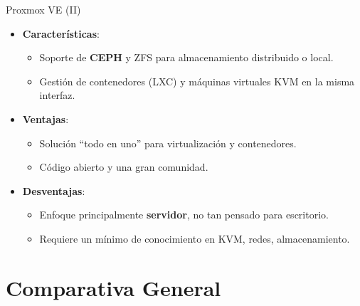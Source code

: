 \documentclass{beamer}
\begin{document}
\begin{frame}{Proxmox VE (II)}
    \begin{itemize}
        \item \textbf{Características}:
            \begin{itemize}
                \item Soporte de \textbf{CEPH} y ZFS para almacenamiento distribuido o local.
                \item Gestión de contenedores (LXC) y máquinas virtuales KVM en la misma interfaz.
            \end{itemize}
        \item \textbf{Ventajas}:
            \begin{itemize}
                \item Solución “todo en uno” para virtualización y contenedores.
                \item Código abierto y una gran comunidad.
            \end{itemize}
        \item \textbf{Desventajas}:
            \begin{itemize}
                \item Enfoque principalmente \textbf{servidor}, no tan pensado para escritorio.
                \item Requiere un mínimo de conocimiento en KVM, redes, almacenamiento.
            \end{itemize}
    \end{itemize}
\end{frame}

\section{Comparativa General}
\end{document}
